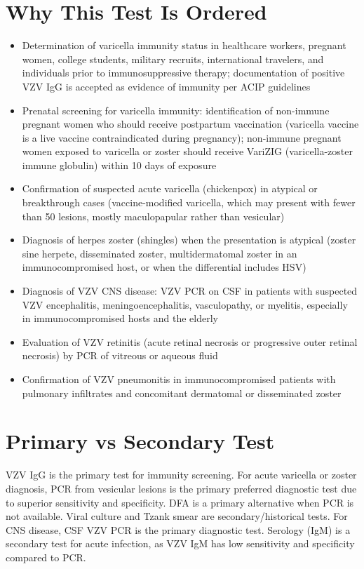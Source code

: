 \section*{Why This Test Is Ordered}
\begin{itemize}
  \item Determination of varicella immunity status in healthcare workers, pregnant women, college students, military recruits, international travelers, and individuals prior to immunosuppressive therapy; documentation of positive VZV IgG is accepted as evidence of immunity per ACIP guidelines
  \item Prenatal screening for varicella immunity: identification of non-immune pregnant women who should receive postpartum vaccination (varicella vaccine is a live vaccine contraindicated during pregnancy); non-immune pregnant women exposed to varicella or zoster should receive VariZIG (varicella-zoster immune globulin) within 10 days of exposure
  \item Confirmation of suspected acute varicella (chickenpox) in atypical or breakthrough cases (vaccine-modified varicella, which may present with fewer than 50 lesions, mostly maculopapular rather than vesicular)
  \item Diagnosis of herpes zoster (shingles) when the presentation is atypical (zoster sine herpete, disseminated zoster, multidermatomal zoster in an immunocompromised host, or when the differential includes HSV)
  \item Diagnosis of VZV CNS disease: VZV PCR on CSF in patients with suspected VZV encephalitis, meningoencephalitis, vasculopathy, or myelitis, especially in immunocompromised hosts and the elderly \cite{gilden2013variegate}
  \item Evaluation of VZV retinitis (acute retinal necrosis or progressive outer retinal necrosis) by PCR of vitreous or aqueous fluid
  \item Confirmation of VZV pneumonitis in immunocompromised patients with pulmonary infiltrates and concomitant dermatomal or disseminated zoster
\end{itemize}

\section*{Primary vs Secondary Test}
VZV IgG is the primary test for immunity screening. For acute varicella or zoster diagnosis, PCR from vesicular lesions is the primary preferred diagnostic test due to superior sensitivity and specificity. DFA is a primary alternative when PCR is not available. Viral culture and Tzank smear are secondary/historical tests. For CNS disease, CSF VZV PCR is the primary diagnostic test. Serology (IgM) is a secondary test for acute infection, as VZV IgM has low sensitivity and specificity compared to PCR.

